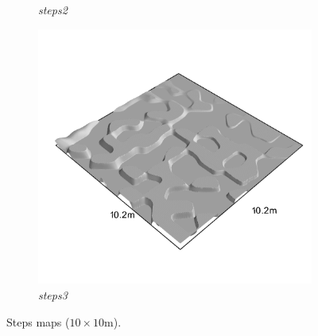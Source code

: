 \documentclass[../document.tex]{subfiles}
\begin{document}
\begin{figure}[H]
\begin{subfigure}[b]{0.32\linewidth}
            \caption{\emph{steps2}}
            \end{subfigure}    
          \begin{subfigure}[b]{0.32\textwidth}
            \includegraphics[width=\textwidth]{../img/hm3d_borders/steps3.png}
            \caption{\emph{steps3}}
        \end{subfigure}    
    \caption{Steps maps ($10\times10$m).}
\end{figure}
\end{document}
